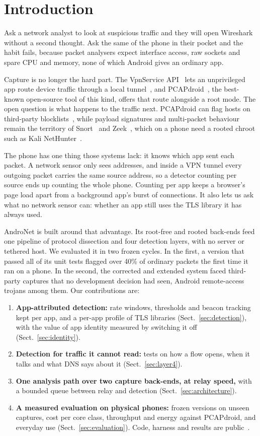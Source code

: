\documentclass[runningheads]{llncs}
\begin{document}
\section{Introduction}

Ask a network analyst to look at suspicious traffic and they will open Wireshark without a second thought. Ask the same of the phone in their pocket and the habit fails, because packet analysers expect interface access, raw sockets and spare CPU and memory, none of which Android gives an ordinary app.

Capture is no longer the hard part. The VpnService API~\cite{vpnservice} lets an unprivileged app route device traffic through a local tunnel~\cite{antmonitor,razaghpanah}, and PCAPdroid~\cite{pcapdroid}, the best-known open-source tool of this kind, offers that route alongside a root mode. The open question is what happens to the traffic next. PCAPdroid can flag hosts on third-party blocklists~\cite{pcapdroiddocs}, while payload signatures and multi-packet behaviour remain the territory of Snort~\cite{snort} and Zeek~\cite{bro}, which on a phone need a rooted chroot such as Kali NetHunter~\cite{nethunter}.

The phone has one thing those systems lack: it knows which app sent each packet. A network sensor only sees addresses, and inside a VPN tunnel every outgoing packet carries the same source address, so a detector counting per source ends up counting the whole phone. Counting per app keeps a browser's page load apart from a background app's burst of connections. It also lets us ask what no network sensor can: whether an app still uses the TLS library it has always used.

AndroNet is built around that advantage. Its root-free and rooted back-ends feed one pipeline of protocol dissection and four detection layers, with no server or tethered host. We evaluated it in two frozen cycles. In the first, a version that passed all of its unit tests flagged over 40\% of ordinary packets the first time it ran on a phone. In the second, the corrected and extended system faced third-party captures that no development decision had seen, Android remote-access trojans among them. Our contributions are:
\begin{enumerate}
\item \textbf{App-attributed detection:} rate windows, thresholds and beacon tracking kept per app, and a per-app profile of TLS libraries (Sect.~\ref{sec:detection}), with the value of app identity measured by switching it off (Sect.~\ref{sec:identity}).
\item \textbf{Detection for traffic it cannot read:} tests on how a flow opens, when it talks and what DNS says about it (Sect.~\ref{sec:layer4}).
\item \textbf{One analysis path over two capture back-ends, at relay speed,} with a bounded queue between relay and detection (Sect.~\ref{sec:architecture}).
\item \textbf{A measured evaluation on physical phones:} frozen versions on unseen captures, cost per core class, throughput and energy against PCAPdroid, and everyday use (Sect.~\ref{sec:evaluation}). Code, harness and results are public~\cite{repo}.
\end{enumerate}
\end{document}
